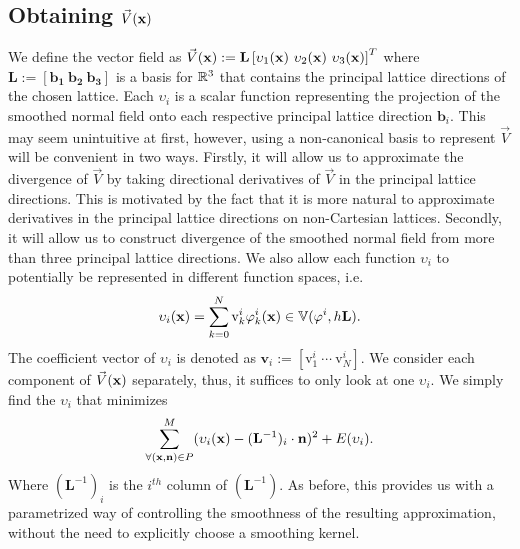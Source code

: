 \subsection{Obtaining $\vec{V}(\mathbf{x})$} \label{sec:getting_vd}
\label{sec:obtainingV}
We define the vector field as $\vec{V}(\vx):=\mathbf{L} \left[\upsilon_1(\vx) \ \upsilon_2(\vx) \ \upsilon_3(\vx)\right]^T$ where $\mathbf{L := [b_1 \ b_2 \ b_3]}$ is a basis for $\mathbb{R}^3$ that contains the principal lattice directions of the chosen lattice. Each $\upsilon_i$ is a scalar function representing the projection of the smoothed normal field onto each respective principal lattice direction $\mathbf{b}_i$. This may seem unintuitive at first, however, using a non-canonical basis to represent $\vec{V}$ will be convenient in two ways. Firstly, it will allow us to approximate the divergence of $\vec{V}$ by taking directional derivatives of $\vec{V}$ in the principal lattice directions. This is motivated by the fact that it is more natural to approximate derivatives in the principal lattice directions on non-Cartesian lattices. Secondly, it will allow us to construct divergence of the smoothed normal field from more than three principal lattice directions. We also allow each function $\upsilon_i$ to potentially be represented in different function spaces, i.e. {\small 
\begin{equation} 
	\upsilon_i(\mathbf{x}) = \sum_{k=0}^N \text{v}_k^i \varphi_k^i(\mathbf{x}) \in \mathbb{V}(\varphi^i, h\mathbf{L}).
\end{equation}}
The coefficient vector of $\upsilon_i$ is denoted as $\mathbf{v}_i:=\left[\text{v}_1^i \ \cdots \ \text{v}_N^i \right]$. We consider each component of $\vec{V}(\mathbf{x})$ separately, thus, it suffices to only look at one $\upsilon_i$. We simply find the $\upsilon_i$ that minimizes {\small 
\begin{equation} \label{eq:vari_eqn}
 	\sump_{\forall (\vx,\vn) \in P }^{M} (\upsilon_i(\vx) - (\mathbf{L}^{-1})_i \cdot \mathbf{n})^2 + E(\upsilon_i).
\end{equation} }
Where $(\mathbf{L}^{-1})_i$ is the $i^{th}$ column of $(\mathbf{L}^{-1}).$ As before, this provides us with a parametrized way of controlling the smoothness of the resulting approximation, without the need to explicitly choose a smoothing kernel.


